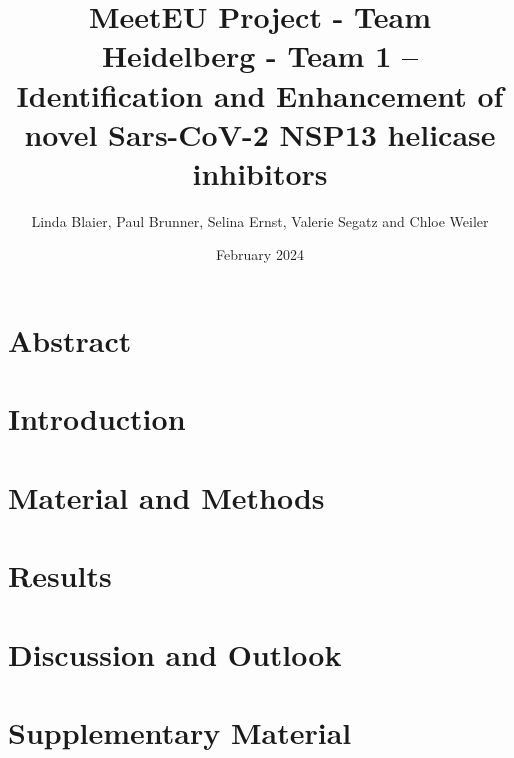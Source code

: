 \documentclass[11pt, letterpaper, titlepage]{article}
\title{MeetEU Project - Team Heidelberg - Team 1 -- \\ Identification and Enhancement of novel Sars-CoV-2 NSP13 helicase inhibitors}
\author{Linda Blaier, Paul Brunner, Selina Ernst, Valerie Segatz and Chloe Weiler}
\date{February 2024}
\begin{document}
\maketitle

\section{Abstract} 
\FloatBarrier

\section{Introduction}
\section{Material and Methods} 
\section{Results} 

\FloatBarrier

\section{Discussion and Outlook}
\pagebreak
\pagebreak
\section{Supplementary Material}

\FloatBarrier


\end{document}
